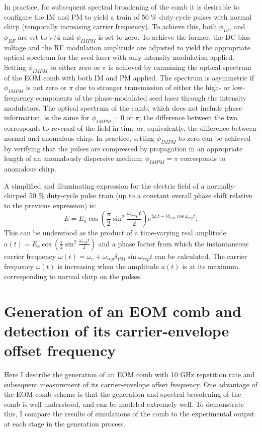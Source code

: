 In practice, for subsequent spectral broadening of the comb it is desirable to configure the IM and PM to yield a train of 50 $\%$ duty-cycle pulses with normal chirp (temporally increasing carrier frequency). To achieve this, both $\phi_{DC}$ and $\phi_{RF}$ are set to $\pi/4$ and $\phi_{IMPM}$ is set to zero. To achieve the former, the DC bias voltage and the RF modulation amplitude are adjusted to yield the appropriate optical spectrum for the seed laser with only intensity modulation applied. Setting $\phi_{IMPM}$ to either zero or $\pi$ is achieved by examining the optical spectrum of the EOM comb with both IM and PM applied. The spectrum is asymmetric if $\phi_{IMPM}$ is not zero or $\pi$ due to stronger transmission of either the high- or low-frequency components of the phase-modulated seed laser through the intensity modulators. The optical spectrum of the comb, which does not include phase information, is the same for $\phi_{IMPM}=0$ or $\pi$; the difference between the two corresponds to reversal of the field in time or, equivalently, the difference between normal and anomalous chirp. In practice, setting $\phi_{IMPM}$ to zero can be achieved by verifying that the pulses are compressed by propagation in an appropriate length of an anomalously dispersive medium; $\phi_{IMPM}=\pi$ corresponds to anomalous chirp.

A simplified and illuminating expression for the electric field of a normally-chirped 50 $\%$ duty-cycle pulse train (up to a constant overall phase shift relative to the previous expression) is:
\begin{equation}
E=E_o\cos\left(\frac{\pi}{2}\sin^2{\frac{\omega_{rep}t}{2}}\right)e^{i\omega_ct-i\delta_{PM}\cos{\omega_{rep}t}}.
\end{equation}
This can be understood as the product of a time-varying real amplitude $a(t)=E_o\cos\left(\frac{\pi}{2}\sin^2{\frac{\omega_{rep}t}{2}}\right)$ and a phase factor from which the instantaneous carrier frequency $\omega(t)=\omega_c+\omega_{rep}\delta_{PM}\sin{\omega_{rep}t}$ can be calculated. The carrier frequency $\omega(t)$ is increasing when the amplitude $a(t)$ is at its maximum, corresponding to normal chirp on the pulses.


\section{Generation of an EOM comb and detection of its carrier-envelope offset frequency}

Here I describe the generation of an EOM comb with 10 GHz repetition rate and subsequent measurement of its carrier-envelope offset frequency. One advantage of the EOM comb scheme is that the generation and spectral broadening of the comb is well understood, and can be modeled extremely well. To demonstrate this, I compare the results of simulations of the comb to the experimental output at each stage in the generation process.

